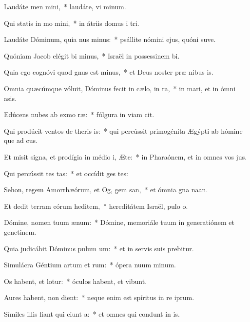 \item Laudáte men mini,~* laudáte, vi minum.
\item Qui statis in mo mini,~* in átriis domus i tri.
\item Laudáte Dóminum, quia nus minus:~* psállite nómini ejus, quóni suve.
\item Quóniam Jacob elégit bi minus,~* Israël in possessinem bi.
\item Quia ego cognóvi quod gnus est minus,~* et Deus noster præ nibus is.
\item Omnia quæcúmque vóluit, Dóminus fecit in cælo,  in ra,~* in mari, et in ómni asis.
\item Edúcens nubes ab exmo ræ:~* fúlgura in viam cit.
\item Qui prodúcit ventos de theris is:~* qui percússit primogénita Ægýpti ab hómine que ad cus.
\item Et misit signa, et prodígia in médio i, Æte:~* in Pharaónem, et in omnes vos jus.
\item Qui percússit tes tas:~* et occídit ges tes:
\item Sehon, regem Amorrhæórum, et Og, gem san,~* et ómnia gna naan.
\item Et dedit terram eórum heditem,~* hereditátem Israël, pulo o.
\item Dómine, nomen tuum  ænum:~* Dómine, memoriále tuum in generatiónem et genetinem.
\item Quia judicábit Dóminus pulum um:~* et in servis suis prebitur.
\item Simulácra Géntium artum et rum:~* ópera nuum minum.
\item Os habent, et  lotur:~* óculos habent, et  vibunt.
\item Aures habent,  non dient:~* neque enim est spíritus in re iprum.
\item Símiles illis fiant qui ciunt a:~* et omnes qui condunt in is.
